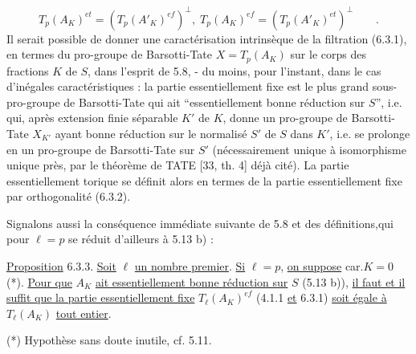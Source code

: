\begin{equation}\tag{6.3.2}
T_p(A_K)^{et} = (T_p(A'_K)^{ef})^{\perp}, \; T_p(A_K)^{ef} = (T_p(A'_K)^{et})^{\perp} \qquad .
\end{equation}
Il serait possible de donner une caractérisation intrinsèque de la filtration (6.3.1), en termes du pro-groupe de Barsotti-Tate $X = T_p(A_K)$ sur le corps des fractions $K$ de $S$, dans l'esprit de 5.8, - du moins, pour l'instant, dans le cas d'inégales caractéristiques : la partie essentiellement fixe est le plus grand sous-pro-groupe de Barsotti-Tate qui ait ``essentiellement bonne réduction sur $S$'', i.e. qui, après extension finie séparable $K'$ de $K$, donne un pro-groupe de Barsotti-Tate $X_{K'}$ ayant bonne réduction sur le normalisé $S'$ de $S$ dans $K'$, i.e. se prolonge en un pro-groupe de Barsotti-Tate sur $S'$ (nécessairement unique à isomorphisme unique près, par le théorème de TATE [33, th. 4] déjà cité). La partie essentiellement torique se définit alors en termes de la partie essentiellement fixe par orthogonalité (6.3.2).

Signalons aussi la conséquence immédiate suivante de 5.8 et des définitions,qui pour $\ell = p$ se réduit d'ailleurs à 5.13 b) :

\underline{Proposition} 6.3.3. \underline{Soit} $\ell$ \underline{un nombre premier}. \underline{Si} $\ell = p$, \underline{on suppose} car.$K = 0$ (*). \underline{Pour que} $A_K$ \underline{ait essentiellement bonne réduction sur} $S$ (5.13 b)), \underline{il faut et il suffit que la partie essentiellement fixe} $T_\ell(A_K)^{ef}$ (4.1.1 \underline{et} 6.3.1) \underline{soit égale à} $T_\ell(A_K)$ \underline{tout entier}.

(*) Hypothèse sans doute inutile, cf. 5.11.



